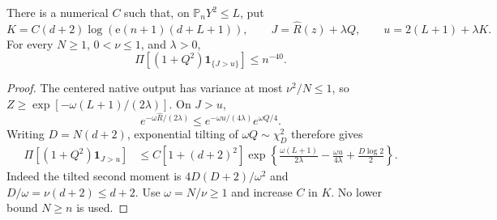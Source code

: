 \begin{lemma}
There is a numerical $C$ such that, on $\mathbb P_nY^2\le L$, put
\[
 K=C(d+2)\log(\mathrm e(n+1)(d+L+1)),\qquad
 J=\widehat R(z)+\lambda Q,\qquad
 u=2(L+1)+\lambda K.
\]
For every $N\ge1$, $0<\nu\le1$, and $\lambda>0$,
\[
 \Pi[(1+Q^2)\mathbf1_{\{J>u\}}]\le n^{-40}.             \tag{GA2}
\]
\end{lemma}
\begin{proof}
The centered native output has variance at most $\nu^2/N\le1$,
so $Z\ge\exp[-\omega(L+1)/(2\lambda)]$.
On $J>u$,
\[
 e^{-\omega\widehat R/(2\lambda)}
 \le e^{-\omega u/(4\lambda)}e^{\omega Q/4}.
\]
Writing $D=N(d+2)$, exponential tilting of $\omega Q\sim\chi_D^2$
therefore gives
\begin{align*}
 \Pi[(1+Q^2)\mathbf1_{J>u}]
 &\le C[1+(d+2)^2]
 \exp\left\{\frac{\omega(L+1)}{2\lambda}
             -\frac{\omega u}{4\lambda}+\frac{D\log2}{2}\right\}.
\end{align*}
Indeed the tilted second moment is $4D(D+2)/\omega^2$ and
$D/\omega=\nu(d+2)\le d+2$.
Use $\omega=N/\nu\ge1$ and increase $C$ in $K$.
No lower bound $N\ge n$ is used.
\end{proof}

